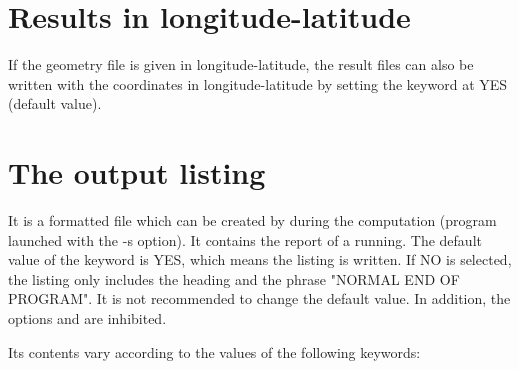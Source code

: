 \section{Results in longitude-latitude}
If the geometry file is given in longitude-latitude, the result files
can also be written with the coordinates in longitude-latitude
by setting the keyword 
at YES (default value).

\section{The output listing}

It is a formatted file which can be created by  during the
computation (program launched with the -s option). It contains the report of a
 running.
The default value of the keyword  is YES,
which means the listing is written.
If NO is selected, the listing only includes the heading and the
phrase "NORMAL END OF PROGRAM".
It is not recommended to change the default value.
In addition, the options  and  are inhibited.

Its contents vary according to the values of the following keywords:

